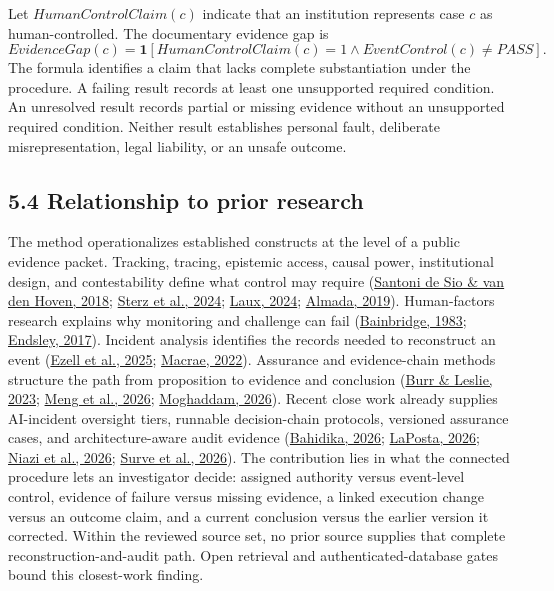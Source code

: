 \documentclass[11pt]{article}
\begin{document}
Let $HumanControlClaim(c)$ indicate that an institution represents case $c$ as human-controlled. The documentary evidence gap is
\[
EvidenceGap(c)=\mathbf{1}[HumanControlClaim(c)=1\land EventControl(c)\neq PASS].
\]
The formula identifies a claim that lacks complete substantiation under the procedure. A failing result records at least one unsupported required condition. An unresolved result records partial or missing evidence without an unsupported required condition. Neither result establishes personal fault, deliberate misrepresentation, legal liability, or an unsafe outcome.
\subsection*{5.4 Relationship to prior research}
The method operationalizes established constructs at the level of a public evidence packet. Tracking, tracing, epistemic access, causal power, institutional design, and contestability define what control may require (\href{https://doi.org/10.3389/frobt.2018.00015}{Santoni de Sio \& van den Hoven, 2018}; \href{https://doi.org/10.1145/3630106.3659051}{Sterz et al., 2024}; \href{https://doi.org/10.1007/s00146-023-01777-z}{Laux, 2024}; \href{https://doi.org/10.1145/3322640.3326699}{Almada, 2019}). Human-factors research explains why monitoring and challenge can fail (\href{https://doi.org/10.1016/0005-1098(83)90046-8}{Bainbridge, 1983}; \href{https://doi.org/10.1177/0018720816681350}{Endsley, 2017}). Incident analysis identifies the records needed to reconstruct an event (\href{https://doi.org/10.1609/aies.v8i1.36596}{Ezell et al., 2025}; \href{https://doi.org/10.1111/risa.13850}{Macrae, 2022}). Assurance and evidence-chain methods structure the path from proposition to evidence and conclusion (\href{https://doi.org/10.1007/s43681-022-00178-0}{Burr \& Leslie, 2023}; \href{https://doi.org/10.48550/arXiv.2605.26340}{Meng et al., 2026}; \href{https://doi.org/10.48550/arXiv.2604.04103}{Moghaddam, 2026}). Recent close work already supplies AI-incident oversight tiers, runnable decision-chain protocols, versioned assurance cases, and architecture-aware audit evidence (\href{https://doi.org/10.14569/IJACSA.2026.0170502}{Bahidika, 2026}; \href{https://doi.org/10.1609/aaaiss.v8i1.42543}{LaPosta, 2026}; \href{https://doi.org/10.3390/automation7030096}{Niazi et al., 2026}; \href{https://doi.org/10.48550/arXiv.2606.21276}{Surve et al., 2026}). The contribution lies in what the connected procedure lets an investigator decide: assigned authority versus event-level control, evidence of failure versus missing evidence, a linked execution change versus an outcome claim, and a current conclusion versus the earlier version it corrected. Within the reviewed source set, no prior source supplies that complete reconstruction-and-audit path. Open retrieval and authenticated-database gates bound this closest-work finding.
\end{document}
